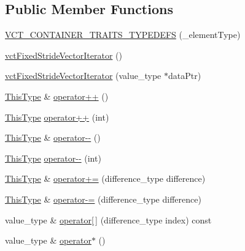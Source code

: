 \subsection*{Public Member Functions}
\begin{DoxyCompactItemize}
\item 
\hyperlink{classvct_fixed_stride_vector_iterator_ab6f5f51f65b48c86fc2fb63260e29db2}{V\-C\-T\-\_\-\-C\-O\-N\-T\-A\-I\-N\-E\-R\-\_\-\-T\-R\-A\-I\-T\-S\-\_\-\-T\-Y\-P\-E\-D\-E\-F\-S} (\-\_\-element\-Type)
\item 
\hyperlink{classvct_fixed_stride_vector_iterator_a549576f58956f187628ea8c592bf1934}{vct\-Fixed\-Stride\-Vector\-Iterator} ()
\item 
\hyperlink{classvct_fixed_stride_vector_iterator_a222932d8d6e5ec48d36ded679bf78e6a}{vct\-Fixed\-Stride\-Vector\-Iterator} (value\-\_\-type $\ast$data\-Ptr)
\item 
\hyperlink{classvct_fixed_stride_vector_const_iterator_ac60fc9d8c2af56a7f251d9a7040efa1e}{This\-Type} \& \hyperlink{classvct_fixed_stride_vector_iterator_adb4af9e7403bf76a44d7310ef8191679}{operator++} ()
\item 
\hyperlink{classvct_fixed_stride_vector_const_iterator_ac60fc9d8c2af56a7f251d9a7040efa1e}{This\-Type} \hyperlink{classvct_fixed_stride_vector_iterator_a367701e515ebcb7bd5fe1e930cccb1e4}{operator++} (int)
\item 
\hyperlink{classvct_fixed_stride_vector_const_iterator_ac60fc9d8c2af56a7f251d9a7040efa1e}{This\-Type} \& \hyperlink{classvct_fixed_stride_vector_iterator_a7f2c805d26275ebda501c49725a3a037}{operator-\/-\/} ()
\item 
\hyperlink{classvct_fixed_stride_vector_const_iterator_ac60fc9d8c2af56a7f251d9a7040efa1e}{This\-Type} \hyperlink{classvct_fixed_stride_vector_iterator_a13bdba8881aee72c05dcddac46508dd6}{operator-\/-\/} (int)
\item 
\hyperlink{classvct_fixed_stride_vector_const_iterator_ac60fc9d8c2af56a7f251d9a7040efa1e}{This\-Type} \& \hyperlink{classvct_fixed_stride_vector_iterator_a326f5b716110462ec981434f667bd1c4}{operator+=} (difference\-\_\-type difference)
\item 
\hyperlink{classvct_fixed_stride_vector_const_iterator_ac60fc9d8c2af56a7f251d9a7040efa1e}{This\-Type} \& \hyperlink{classvct_fixed_stride_vector_iterator_a6cbd413bff4f998c7b27cf8802ce53c2}{operator-\/=} (difference\-\_\-type difference)
\item 
value\-\_\-type \& \hyperlink{classvct_fixed_stride_vector_iterator_a668dfba908528cdcfba0882ef2ae804d}{operator\mbox{[}$\,$\mbox{]}} (difference\-\_\-type index) const 
\item 
value\-\_\-type \& \hyperlink{classvct_fixed_stride_vector_iterator_a1f1b3bb2bd7e4e41e480cdcc97ef6d9a}{operator$\ast$} ()
\end{DoxyCompactItemize}
